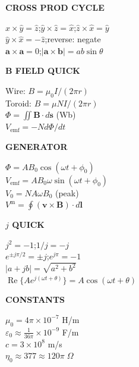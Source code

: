 \documentclass[6pt,letterpaper]{article}
\newcommand{\shead}[3]{%
  \noindent\colorbox{#1}{\parbox{\dimexpr\linewidth-2\fboxsep\relax}%
  {\color{#2}\bfseries\fontsize{6}{7}\selectfont #3}}\vspace{0.5pt}}
\begin{document}
\vfill
\noindent
\begin{minipage}[t]{0.19\linewidth}
\shead{purplebg}{purple}{CROSS PROD CYCLE}
\begin{ebox}
$\hat{x}\!\times\!\hat{y}=\hat{z}$;\;$\hat{y}\!\times\!\hat{z}=\hat{x}$;\;$\hat{z}\!\times\!\hat{x}=\hat{y}$\\
$\hat{y}\!\times\!\hat{x}=-\hat{z}$;\;reverse: negate\\
$\mathbf{a}\!\times\!\mathbf{a}=0$;\;$|\mathbf{a}\!\times\!\mathbf{b}|=ab\sin\theta$
\end{ebox}
\end{minipage}\hfill
\begin{minipage}[t]{0.19\linewidth}
\shead{tealbg}{teal}{B FIELD QUICK}
\begin{ebox}
Wire: $B=\mu_0I/(2\pi r)$\\
Toroid: $B=\mu NI/(2\pi r)$\\
$\Phi=\iint\mathbf{B}\cdot d\mathbf{s}$ (Wb)\\
$V_\text{emf}=-Nd\Phi/dt$
\end{ebox}
\end{minipage}\hfill
\begin{minipage}[t]{0.19\linewidth}
\shead{amberbg}{amber}{GENERATOR}
\begin{ebox}
$\Phi=AB_0\cos(\omega t+\phi_0)$\\
$V_\text{emf}=AB_0\omega\sin(\omega t+\phi_0)$\\
$V_0=NA\omega B_0$ (peak)\\
$V^\text{m}=\oint(\mathbf{v}\!\times\!\mathbf{B})\cdot d\mathbf{l}$
\end{ebox}
\end{minipage}\hfill
\begin{minipage}[t]{0.19\linewidth}
\shead{pinkbg}{pink}{$j$ QUICK}
\begin{ebox}
$j^2=-1$;\;$1/j=-j$\\
$e^{\pm j\pi/2}=\pm j$;\;$e^{j\pi}=-1$\\
$|a+jb|=\sqrt{a^2+b^2}$\\
$\operatorname{Re}\{Ae^{j(\omega t+\theta)}\}=A\cos(\omega t+\theta)$
\end{ebox}
\end{minipage}\hfill
\begin{minipage}[t]{0.19\linewidth}
\shead{graybg}{gray}{CONSTANTS}
\begin{ebox}
$\mu_0=4\pi\!\times\!10^{-7}$ H/m\\
$\varepsilon_0\approx\frac{1}{36\pi}\!\times\!10^{-9}$ F/m\\
$c=3\!\times\!10^8$ m/s\\
$\eta_0\approx377\approx120\pi\;\Omega$
\end{ebox}
\end{minipage}
\end{document}

